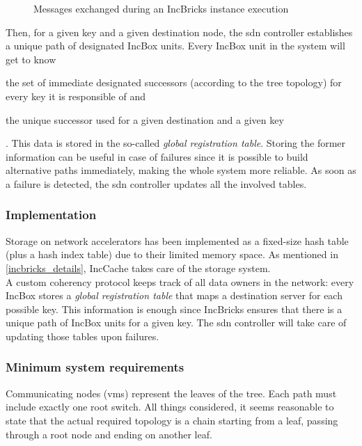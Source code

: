 \begin{figure}[!htb]
    \centering
    \usebox{\incbrickssd}
    \caption{Messages exchanged during an IncBricks \texorpdfstring{\cite{incbricks}}{} instance execution}
\end{figure}

Then, for a given key and a given destination node, the \gls{sdn} controller establishes a unique path of designated IncBox units.
Every IncBox unit in the system will get to know
\begin{mylist}
    \item the set of immediate designated successors (according to the tree topology) for every key it is responsible of and
    \item the unique successor used for a given destination and a given key
\end{mylist}.
This data is stored in the so-called \textit{global registration table}.
Storing the former information can be useful in case of failures since it is possible to build alternative paths immediately, making the whole system more reliable.
As soon as a failure is detected, the \gls{sdn} controller updates all the involved tables.

\subsubsection{Implementation}
Storage on network accelerators has been implemented as a fixed-size hash table (plus a hash index table) due to their limited memory space.
As mentioned in \autoref{incbricks_details}, IncCache takes care of the storage system.\\
A custom coherency protocol keeps track of all data owners in the network: every IncBox stores a \textit{global registration table} that maps a destination server for each possible key.
This information is enough since IncBricks \cite{incbricks} ensures that there is a unique path of IncBox units for a given key.
The \gls{sdn} controller will take care of updating those tables upon failures.

\subsubsection{Minimum system requirements}
Communicating nodes (\glspl{vm}) represent the leaves of the tree.
Each path must include exactly one root switch.
All things considered, it seems reasonable to state that the actual required topology is a chain starting from a leaf, passing through a root node and ending on another leaf.

